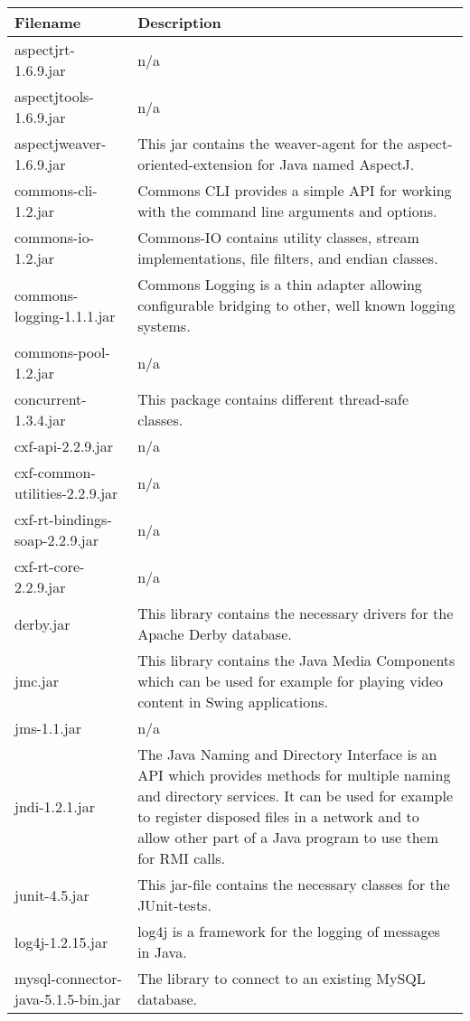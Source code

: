 \begin{center}
\begin{longtable}{|p{}|p{}|}
\hline 
Filename & Description\\
\hline
\hline 
aspectjrt-1.6.9.jar & n/a\\
\hline 
aspectjtools-1.6.9.jar & n/a\\
\hline 
aspectjweaver-1.6.9.jar & This jar contains the weaver-agent for the aspect-oriented-extension for Java named AspectJ.\\
\hline 
commons-cli-1.2.jar & Commons CLI provides a simple API for working with the command line arguments and options.\\
\hline 
commons-io-1.2.jar & Commons-IO contains utility classes, stream implementations, file filters, and endian classes.\\
\hline 
commons-logging-1.1.1.jar & Commons Logging is a thin adapter allowing configurable bridging to other, well known logging systems.\\
\hline 
commons-pool-1.2.jar & n/a\\
\hline 
concurrent-1.3.4.jar & This package contains different thread-safe classes.\\
\hline 
cxf-api-2.2.9.jar & n/a\\
\hline 
cxf-common-utilities-2.2.9.jar & n/a\\
\hline 
cxf-rt-bindings-soap-2.2.9.jar & n/a\\
\hline 
cxf-rt-core-2.2.9.jar & n/a\\
\hline 
derby.jar & This library contains the necessary drivers for the Apache Derby database.\\
\hline 
jmc.jar & This library contains the Java Media Components which can be used for example for playing video content in Swing applications.\\
\hline 
jms-1.1.jar & n/a\\
\hline 
jndi-1.2.1.jar & The Java Naming and Directory Interface is an API which provides methods for multiple naming and directory services. It can be used for example to register disposed files in a network and to allow other part of a Java program to use them for RMI calls.\\
\hline 
junit-4.5.jar & This jar-file contains the necessary classes for the JUnit-tests.\\
\hline 
log4j-1.2.15.jar & log4j is a framework for the logging of messages in Java.\\
\hline 
mysql-connector-java-5.1.5-bin.jar & The library to connect to an existing MySQL database.\\

\end{longtable}
\end{center}
